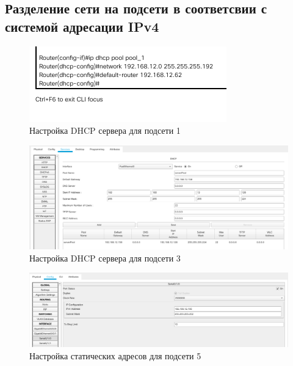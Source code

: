 \documentclass[12pt]{report}
\begin{document}
\subsection*{Разделение сети на подсети в соответсвии с системой адресации IPv4}

\begin{figure}[H]
	\begin{center}
		\includegraphics[scale=0.75]{img/2.png}
	\end{center}
	\caption{Настройка DHCP сервера для подсети 1}
	\label{fig:2}
\end{figure}

\begin{figure}[H]
	\begin{center}
		\includegraphics[scale=0.4]{img/4.png}
	\end{center}
	\caption{Настройка DHCP сервера для подсети 3}
	\label{fig:3}
\end{figure}

\begin{figure}[H]
	\begin{center}
		\includegraphics[scale=0.4]{img/3.png}
	\end{center}
	\caption{Настройка статических адресов для подсети 5}
	\label{fig:4}
\end{figure}
\end{document}
